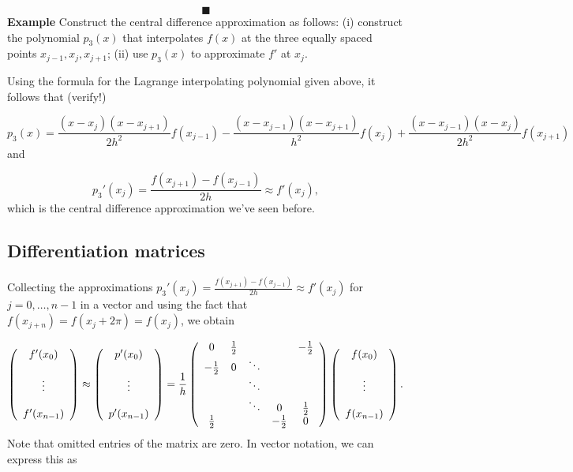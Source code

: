 \documentclass[12pt,a4paper]{article}
\begin{document}
\[
\blacksquare
\]
\textbf{Example} Construct the central difference approximation as follows: (i) construct the polynomial $p_3(x)$ that interpolates $f(x)$  at the three equally spaced points $x_{j-1}, x_j, x_{j+1}$; (ii) use $p_3(x)$ to approximate  $f'$ at $x_j$.

Using the formula for the Lagrange interpolating polynomial given above, it follows that (verify!)

\[
p_3(x) = \frac{(x-x_{j})(x-x_{j+1})}{2h^2}f(x_{j-1}) - \frac{(x-x_{j-1})(x-x_{j+1})}{h^2}f(x_{j}) + \frac{(x-x_{j-1})(x-x_{j})}{2h^2}f(x_{j+1})
\]
and

\[
p_3'(x_j) = \frac{f(x_{j+1}) - f(x_{j-1})}{2h}  \approx f'(x_j),
\]
which is the central difference approximation we've seen before.

\subsection{Differentiation matrices}
Collecting the approximations $p_3'(x_j) = \frac{f(x_{j+1}) - f(x_{j-1})}{2h}  \approx f'(x_j)$ for $j = 0, \ldots, n-1$ in a vector and using the fact that $f(x_{j+n}) = f(x_j + 2\pi) = f(x_{j})$, we obtain

\[
\left(
\begin{array}{c c c c c}
f'(x_0) \\
  \\
\vdots  \\
  \\
f'(x_{n-1})
\end{array}
\right) \approx 
\left(
\begin{array}{c c c c c}
p'(x_0) \\
  \\
\vdots  \\
  \\
p'(x_{n-1})
\end{array}
\right) = \frac{1}{h}
\left(
\begin{array}{c c c c c}
0 & \frac{1}{2} &   &   &  -\frac{1}{2} \\
-\frac{1}{2} & 0 & \ddots &  &  \\
   &   & \ddots &  &   \\
   &   & \ddots & 0 &  \frac{1}{2} \\
 \frac{1}{2}  &   &   & -\frac{1}{2} & 0
\end{array}
\right)
\left(
\begin{array}{c c c c c}
f(x_0) \\
  \\
\vdots  \\
  \\
f(x_{n-1})
\end{array}
\right).
\]
Note that omitted entries of the matrix are zero.  In vector notation, we can express this as
\end{document}
